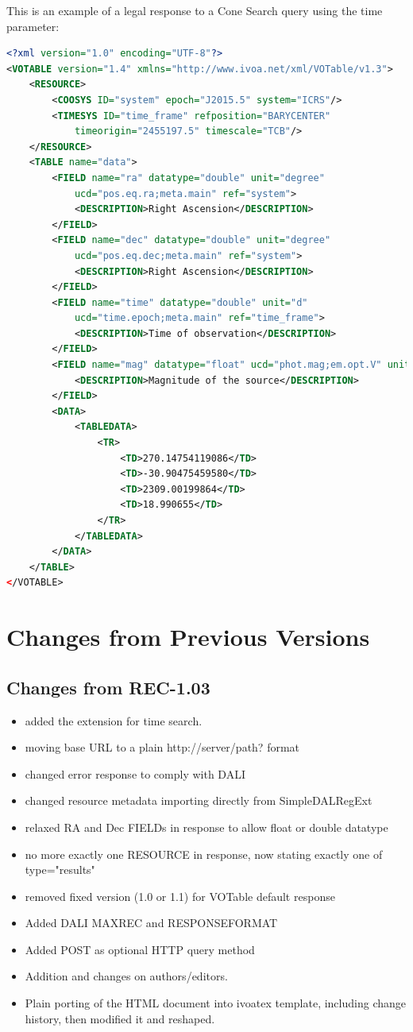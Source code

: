 \documentclass[11pt,a4paper]{ivoa} 
\begin{document}
This is an example of a legal response to a Cone Search query using the
time parameter:
\begin{lstlisting}[language=XML,basicstyle=\footnotesize] 
<?xml version="1.0" encoding="UTF-8"?> 
<VOTABLE version="1.4" xmlns="http://www.ivoa.net/xml/VOTable/v1.3">
	<RESOURCE>
		<COOSYS ID="system" epoch="J2015.5" system="ICRS"/> 
		<TIMESYS ID="time_frame" refposition="BARYCENTER" 
			timeorigin="2455197.5" timescale="TCB"/>
	</RESOURCE>
	<TABLE name="data">
		<FIELD name="ra" datatype="double" unit="degree" 
			ucd="pos.eq.ra;meta.main" ref="system"> 
			<DESCRIPTION>Right Ascension</DESCRIPTION>
		</FIELD> 
		<FIELD name="dec" datatype="double" unit="degree" 
			ucd="pos.eq.dec;meta.main" ref="system">
			<DESCRIPTION>Right Ascension</DESCRIPTION>
		</FIELD>
		<FIELD name="time" datatype="double" unit="d" 
			ucd="time.epoch;meta.main" ref="time_frame">
			<DESCRIPTION>Time of observation</DESCRIPTION>
		</FIELD>
		<FIELD name="mag" datatype="float" ucd="phot.mag;em.opt.V" unit="mag"/>
			<DESCRIPTION>Magnitude of the source</DESCRIPTION>
		</FIELD>
		<DATA>
			<TABLEDATA>
				<TR>
					<TD>270.14754119086</TD>
					<TD>-30.90475459580</TD>
					<TD>2309.00199864</TD>
				 	<TD>18.990655</TD>
				</TR>
			</TABLEDATA>
		</DATA> 
	</TABLE>
</VOTABLE>
\end{lstlisting}


\section{Changes from Previous Versions} \label{app:changes}

\subsection{Changes from REC-1.03} 
\begin{itemize}[noitemsep] 
\item added the extension for time search.  
\item moving base URL to a plain http://server/path? format 
\item changed error response to comply with DALI 
\item changed resource metadata importing directly from SimpleDALRegExt 
\item relaxed RA and Dec FIELDs in response to allow float or double datatype 
\item no more exactly one RESOURCE in response, now stating exactly one of type="results" 
\item removed fixed version (1.0 or 1.1) for VOTable default response 
\item Added DALI MAXREC and RESPONSEFORMAT 
\item Added POST as optional HTTP query method 
\item Addition and changes on authors/editors.  
\item Plain porting of the HTML document into ivoatex template, 
including change history, then modified it and reshaped.  
\end{itemize}
\end{document}

